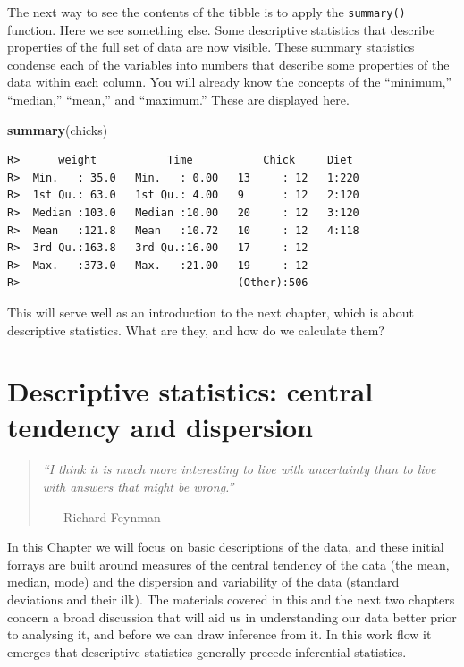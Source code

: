 \documentclass[english,10pt,a4paper,oneside]{book}
\newenvironment{Shaded}{\begin{snugshade}}{\end{snugshade}}
\newcommand{\KeywordTok}[1]{\textcolor[rgb]{0.13,0.29,0.53}{\textbf{#1}}}
\newcommand{\NormalTok}[1]{#1}
\theoremstyle{definition}
\theoremstyle{definition}
\theoremstyle{definition}
\theoremstyle{remark}
\begin{document}
The next way to see the contents of the tibble is to apply the
\texttt{summary()} function. Here we see something else. Some
descriptive statistics that describe properties of the full set of data
are now visible. These summary statistics condense each of the variables
into numbers that describe some properties of the data within each
column. You will already know the concepts of the \enquote{minimum,}
\enquote{median,} \enquote{mean,} and \enquote{maximum.} These are
displayed here.

\begin{Shaded}
\begin{Highlighting}[]
\KeywordTok{summary}\NormalTok{(chicks)}
\end{Highlighting}
\end{Shaded}

\begin{verbatim}
R>      weight           Time           Chick     Diet   
R>  Min.   : 35.0   Min.   : 0.00   13     : 12   1:220  
R>  1st Qu.: 63.0   1st Qu.: 4.00   9      : 12   2:120  
R>  Median :103.0   Median :10.00   20     : 12   3:120  
R>  Mean   :121.8   Mean   :10.72   10     : 12   4:118  
R>  3rd Qu.:163.8   3rd Qu.:16.00   17     : 12          
R>  Max.   :373.0   Max.   :21.00   19     : 12          
R>                                  (Other):506
\end{verbatim}

This will serve well as an introduction to the next chapter, which is
about descriptive statistics. What are they, and how do we calculate
them?

\chapter{Descriptive statistics: central tendency and
dispersion}\label{descriptive-statistics-central-tendency-and-dispersion}

\begin{quote}
\emph{\enquote{I think it is much more interesting to live with
uncertainty than to live with answers that might be wrong.}}

---- Richard Feynman
\end{quote}

In this Chapter we will focus on basic descriptions of the data, and
these initial forrays are built around measures of the central tendency
of the data (the mean, median, mode) and the dispersion and variability
of the data (standard deviations and their ilk). The materials covered
in this and the next two chapters concern a broad discussion that will
aid us in understanding our data better prior to analysing it, and
before we can draw inference from it. In this work flow it emerges that
descriptive statistics generally precede inferential statistics.
\end{document}
